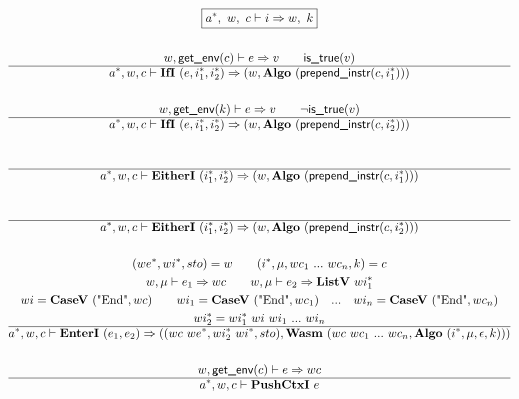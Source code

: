 \begin{gather*}
  \boxed{\seq{a}, ~ w, ~ c \vdash i \Rightarrow w, ~ k} \\
%
\newline \\
  w, \getenv(c) \vdash e \Rightarrow v \qquad
  \istrue(v) \\
  \hline
  \seq{a}, w, c \vdash \ifi ~ (e, \seq{i_1}, \seq{i_2}) \Rightarrow
  (w, \algo ~ (\prependinstr(c, \seq{i_1}))) \\
%
\newline \\
  w, \getenv(k) \vdash e \Rightarrow v \qquad
  \neg \istrue(v) \\
  \hline
  \seq{a}, w, c \vdash \ifi ~ (e, \seq{i_1}, \seq{i_2}) \Rightarrow
  (w, \algo ~ (\prependinstr(c, \seq{i_2}))) \\
%
\newline \\
  \\
  \hline
  \seq{a}, w, c \vdash \eitheri ~ (\seq{i_1}, \seq{i_2}) \Rightarrow
  (w, \algo ~ (\prependinstr(c, \seq{i_1}))) \\
%
\newline \\
  \\
  \hline
  \seq{a}, w, c \vdash \eitheri ~ (\seq{i_1}, \seq{i_2}) \Rightarrow
  (w, \algo ~ (\prependinstr(c, \seq{i_2}))) \\
%
\newline \\
  (\seq{we}, \seq{wi}, sto) = w \qquad
  (i^*, \mu, wc_1 ~ ... ~ wc_n, k) = c \\
  w, \mu \vdash e_1 \Rightarrow wc \qquad
  w, \mu \vdash e_2 \Rightarrow \listv ~ \seq{wi_1} \\
  wi = \casev ~ (\text{"End"}, wc) \qquad
  wi_1 = \casev ~ (\text{"End"}, wc_1) \quad ... \quad wi_n = \casev ~ (\text{"End"}, wc_n) \\
  wi_2^* = wi_1^* ~ wi ~ wi_1 ~ ... ~ wi_n \\
  \hline
  \seq{a}, w, c \vdash \enteri ~ (e_1, e_2)
  \Rightarrow
  (
    (wc ~ \seq{we}, wi_2^* ~ \seq{wi}, sto),
    \wasm ~ (wc ~ wc_1 ~ ... ~ wc_n, \algo ~ (i^*, \mu, \epsilon, k))
  ) \\
%
\newline \\
  w, \getenv(c) \vdash e \Rightarrow wc \\
  \hline
  \seq{a}, w, c \vdash \pushctxi ~ e

\end{gather*}

